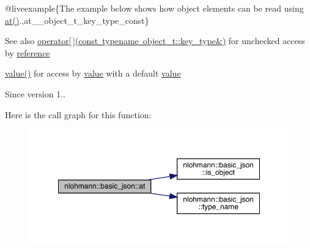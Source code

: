 @liveexample\{The example below shows how object elements can be read using {\ttfamily \mbox{\hyperlink{classnlohmann_1_1basic__json_a73ae333487310e3302135189ce8ff5d8}{at()}}}.,at\+\_\+\+\_\+object\+\_\+t\+\_\+key\+\_\+type\+\_\+const\}

\begin{DoxySeeAlso}{See also}
\mbox{\hyperlink{classnlohmann_1_1basic__json_a233b02b0839ef798942dd46157cc0fe6}{operator\mbox{[}$\,$\mbox{]}(const typename object\+\_\+t\+::key\+\_\+type\&)}} for unchecked access by \mbox{\hyperlink{classnlohmann_1_1basic__json_ac6a5eddd156c776ac75ff54cfe54a5bc}{reference}} 

\mbox{\hyperlink{classnlohmann_1_1basic__json_af9c51328fbe1da75eca750be3009917a}{value()}} for access by \mbox{\hyperlink{classnlohmann_1_1basic__json_af9c51328fbe1da75eca750be3009917a}{value}} with a default \mbox{\hyperlink{classnlohmann_1_1basic__json_af9c51328fbe1da75eca750be3009917a}{value}}
\end{DoxySeeAlso}
\begin{DoxySince}{Since}
version 1.. 
\end{DoxySince}
Here is the call graph for this function\+:\nopagebreak
\begin{figure}[H]
\begin{center}
\leavevmode
\includegraphics[width=350pt]{classnlohmann_1_1basic__json_acac9d438c9bb12740dcdb01069293a34_cgraph}
\end{center}
\end{figure}
\mbox{\label{classnlohmann_1_1basic__json_a8ab61397c10f18b305520da7073b2b45}} 
